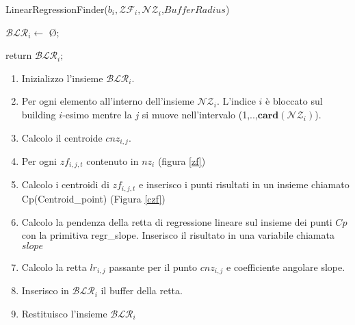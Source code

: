 \begin{algorithm}[H]
	
	\IncMargin{1em}
	\caption{LinearRegressionFinder($b_i , \mathcal{ZF}_i , \mathcal{NZ}_i$,$BufferRadius$)}
	\label{alg:four}
	\BlankLine
	\SetAlgoNoLine
	$\mathcal{BLR}_i \leftarrow$ \O ;\\
	
	return $\mathcal{BLR}_i;$
	
\end{algorithm}

\begin{enumerate}
	\item Inizializzo l'insieme $\mathcal{BLR}_i$.
	\item Per ogni elemento all'interno dell'insieme $\mathcal{NZ}_i$. L'indice $i$ è bloccato sul building $i$-esimo mentre la $j$ si muove nell'intervalo (1,..,$\mathbf{card}(\mathcal{NZ}_i)$).
	\item Calcolo il centroide $cnz_{i,j}$.
	\item Per ogni $zf_{i,j,t}$ contenuto in $nz_i$ (figura \ref{zf}) 
	\item Calcolo i centroidi di $zf_{i,j,t}$ e inserisco i punti risultati in un insieme chiamato Cp(Centroid\_point) (Figura \ref{czf})
	\item Calcolo la pendenza della retta di regressione lineare sul insieme dei punti $Cp$ con la primitiva regr\_slope. Inserisco il risultato in una variabile chiamata $slope$
	\item Calcolo la retta $lr_{i,j}$ passante per il punto $cnz_{i,j}$ e coefficiente angolare slope.
	\item Inserisco in $\mathcal{BLR}_i$ il buffer della retta.
	\item Restituisco l'insieme $\mathcal{BLR}_i$
\end{enumerate}


